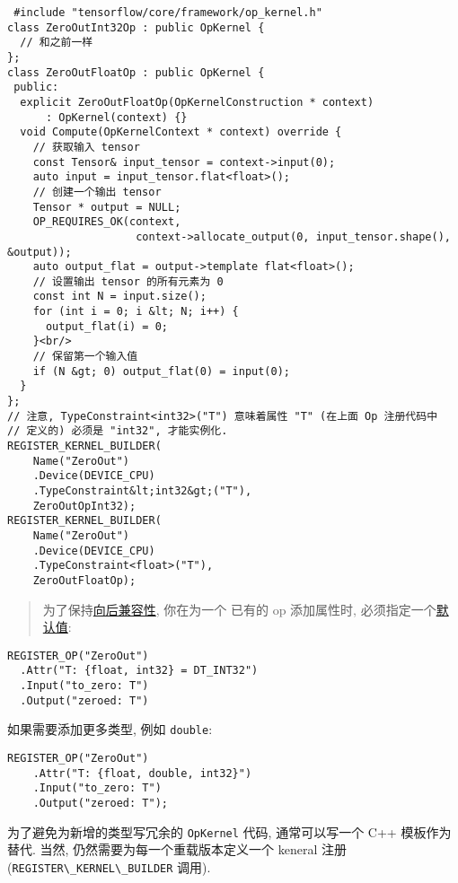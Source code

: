 \begin{verbatim}
 #include "tensorflow/core/framework/op_kernel.h"
class ZeroOutInt32Op : public OpKernel {
  // 和之前一样
};
class ZeroOutFloatOp : public OpKernel {
 public:
  explicit ZeroOutFloatOp(OpKernelConstruction * context)
      : OpKernel(context) {}
  void Compute(OpKernelContext * context) override {
    // 获取输入 tensor
    const Tensor& input_tensor = context->input(0);
    auto input = input_tensor.flat<float>();
    // 创建一个输出 tensor
    Tensor * output = NULL;
    OP_REQUIRES_OK(context,
                    context->allocate_output(0, input_tensor.shape(), &output));
    auto output_flat = output->template flat<float>();
    // 设置输出 tensor 的所有元素为 0
    const int N = input.size();
    for (int i = 0; i &lt; N; i++) {
      output_flat(i) = 0;
    }<br/>
    // 保留第一个输入值
    if (N &gt; 0) output_flat(0) = input(0);
  }
};
// 注意, TypeConstraint<int32>("T") 意味着属性 "T" (在上面 Op 注册代码中
// 定义的) 必须是 "int32", 才能实例化.
REGISTER_KERNEL_BUILDER(
    Name("ZeroOut")
    .Device(DEVICE_CPU)
    .TypeConstraint&lt;int32&gt;("T"),
    ZeroOutOpInt32);
REGISTER_KERNEL_BUILDER(
    Name("ZeroOut")
    .Device(DEVICE_CPU)
    .TypeConstraint<float>("T"),
    ZeroOutFloatOp);
\end{verbatim}

\begin{quote}
为了保持\protect\hyperlink{backwards-compatibility}{向后兼容性},
你在为一个 已有的 op 添加属性时,
必须指定一个\protect\hyperlink{default-values-constraints}{默认值}:
\end{quote}

\begin{verbatim}
REGISTER_OP("ZeroOut")
  .Attr("T: {float, int32} = DT_INT32")
  .Input("to_zero: T")
  .Output("zeroed: T")
\end{verbatim}

如果需要添加更多类型, 例如 \texttt{double}:

\begin{verbatim}
REGISTER_OP("ZeroOut")
    .Attr("T: {float, double, int32}")
    .Input("to_zero: T")
    .Output("zeroed: T");
\end{verbatim}

为了避免为新增的类型写冗余的 \texttt{OpKernel} 代码, 通常可以写一个 C++
模板作为替代. 当然, 仍然需要为每一个重载版本定义一个 keneral 注册
(\texttt{REGISTER\textbackslash{}\_KERNEL\textbackslash{}\_BUILDER}
调用).

